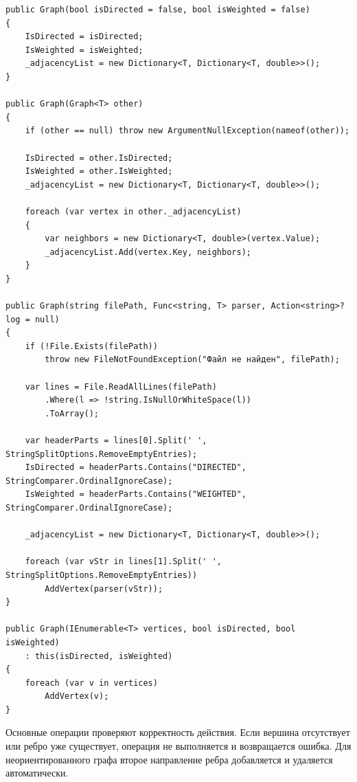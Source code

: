 \documentclass[pract]{SCWorks}
\begin{document}
    \begin{verbatim}
public Graph(bool isDirected = false, bool isWeighted = false)
{
    IsDirected = isDirected;
    IsWeighted = isWeighted;
    _adjacencyList = new Dictionary<T, Dictionary<T, double>>();
}

public Graph(Graph<T> other)
{
    if (other == null) throw new ArgumentNullException(nameof(other));

    IsDirected = other.IsDirected;
    IsWeighted = other.IsWeighted;
    _adjacencyList = new Dictionary<T, Dictionary<T, double>>();

    foreach (var vertex in other._adjacencyList)
    {
        var neighbors = new Dictionary<T, double>(vertex.Value);
        _adjacencyList.Add(vertex.Key, neighbors);
    }
}

public Graph(string filePath, Func<string, T> parser, Action<string>? log = null)
{
    if (!File.Exists(filePath))
        throw new FileNotFoundException("Файл не найден", filePath);

    var lines = File.ReadAllLines(filePath)
        .Where(l => !string.IsNullOrWhiteSpace(l))
        .ToArray();

    var headerParts = lines[0].Split(' ', StringSplitOptions.RemoveEmptyEntries);
    IsDirected = headerParts.Contains("DIRECTED", StringComparer.OrdinalIgnoreCase);
    IsWeighted = headerParts.Contains("WEIGHTED", StringComparer.OrdinalIgnoreCase);

    _adjacencyList = new Dictionary<T, Dictionary<T, double>>();

    foreach (var vStr in lines[1].Split(' ', StringSplitOptions.RemoveEmptyEntries))
        AddVertex(parser(vStr));
}

public Graph(IEnumerable<T> vertices, bool isDirected, bool isWeighted)
    : this(isDirected, isWeighted)
{
    foreach (var v in vertices)
        AddVertex(v);
}
    \end{verbatim}

    Основные операции проверяют корректность действия.
    Если вершина отсутствует или ребро уже существует, операция не выполняется и возвращается ошибка.
    Для неориентированного графа второе направление ребра добавляется и удаляется автоматически.
\end{document}
